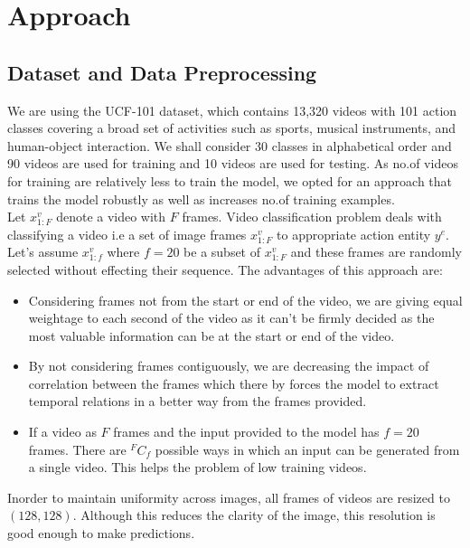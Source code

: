 \documentclass[10pt,twocolumn,letterpaper]{article}
\begin{document}

\section{Approach}
\label{section:approach}
\subsection{Dataset and Data Preprocessing}
We are using the UCF-101 dataset, which contains 13,320 videos with 101 action classes covering a broad set of activities such as sports, musical instruments, and human-object interaction. We shall consider 30 classes in alphabetical order and 90 videos are used for training and 10 videos are used for testing. As no.of videos for training are relatively less to train the model, we opted for an approach that trains the model robustly as well as increases no.of training examples.\\

Let $x_{1:F}^v$ denote a video with $F$ frames. Video classification problem deals with classifying a video i.e a set of image frames $x_{1:F}^v$ to appropriate action entity $y^{e}$. Let's assume $x_{1:f}^v$ where $f=20$ be a subset of $x_{1:F}^v$ and these frames are randomly selected without effecting their sequence. The advantages of this approach are:
\begin{itemize}
\setlength\itemsep{0.01em}
\item Considering frames not from the start or end of the video, we are giving equal weightage to each second of the video as it can't be firmly decided as the most valuable information can be at the start or end of the video.
\item By not considering frames contiguously, we are decreasing the impact of correlation between the frames which there by forces the model to extract temporal relations in a better way from the frames provided.
\item If a video as $F$ frames and the input provided to the model has $f = 20$ frames. There are ${}^{F}C_{f}$ possible ways in which an input can be generated from a single video. This helps the problem of low training videos.
\end{itemize}
Inorder to maintain uniformity across images, all frames of videos are resized to $(128,128)$. Although this reduces the clarity of the image, this resolution is good enough to make predictions.
\end{document}
